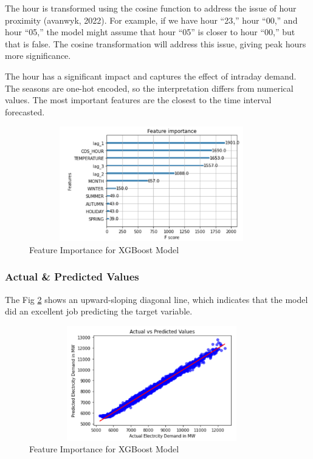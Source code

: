 \documentclass[mstat,12pt]{unswthesis}
\begin{document}
The hour is transformed using the cosine function to address the issue
of hour proximity (avanwyk, 2022). For example, if we have hour ``23,''
hour ``00,'' and hour ``05,'' the model might assume that hour ``05'' is
closer to hour ``00,'' but that is false. The cosine transformation will
address this issue, giving peak hours more significance.

The hour has a significant impact and captures the effect of intraday
demand. The seasons are one-hot encoded, so the interpretation differs
from numerical values. The most important features are the closest to
the time interval forecasted.

\begin{figure}[H]
\centering
\includegraphics[width=0.95\textwidth, height=5cm]{featureimp.png}
\caption{Feature Importance for XGBoost Model}\label{featureimp}
\end{figure}

\subsubsection{Actual \& Predicted
Values}\label{actual-predicted-values}

The Fig \ref{actualpredict} shows an upward-sloping diagonal line, which
indicates that the model did an excellent job predicting the target
variable.

\begin{figure}[H]
\centering
\includegraphics[width=0.95\textwidth, height=5cm]{actualpredict.png}
\caption{Feature Importance for XGBoost Model}\label{actualpredict}
\end{figure}
\end{document}
